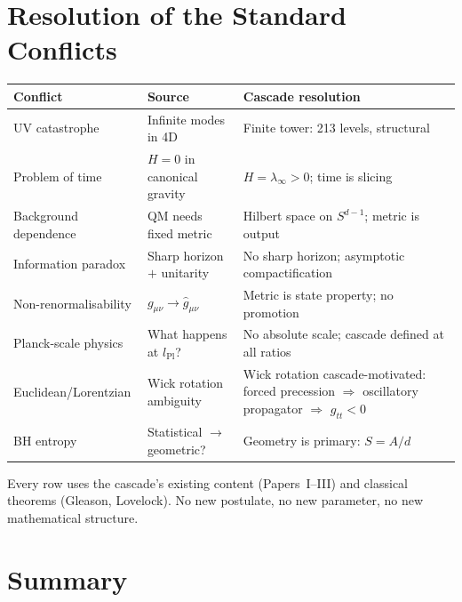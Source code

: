 \documentclass[12pt,a4paper]{article}
\begin{document}
\section{Resolution of the Standard Conflicts}\label{sec:resolution-of-the-standard-conflicts}

\begin{center}
\small
\begin{tabular}{p{3.5cm}p{3.8cm}p{4.5cm}}
\hline
Conflict & Source & Cascade resolution \\
\hline
UV catastrophe & Infinite modes in 4D & Finite tower: 213 levels, structural \\
Problem of time & $H = 0$ in canonical gravity & $H = \lambda_\infty > 0$; time is
slicing \\
Background dependence & QM needs fixed metric & Hilbert space on $S^{d-1}$; metric
is output \\
Information paradox & Sharp horizon $+$ unitarity & No sharp horizon; asymptotic
compactification \\
Non-renormalisability & $g_{\mu\nu} \to \hat{g}_{\mu\nu}$ & Metric is state property;
no promotion \\
Planck-scale physics & What happens at $l_{\mathrm{Pl}}$? & No absolute scale; cascade
defined at all ratios \\
Euclidean/\allowbreak Lorentzian & Wick rotation ambiguity & Wick rotation cascade-motivated:
forced precession $\Rightarrow$ oscillatory propagator $\Rightarrow$ $g_{tt} < 0$ \\
BH entropy & Statistical $\to$ geometric? & Geometry is primary: $S = A/d$ \\
\hline
\end{tabular}
\end{center}

Every row uses the cascade's existing content (Papers~I--III) and classical
theorems (Gleason, Lovelock). No new postulate, no new parameter, no new
mathematical structure.

\section{Summary}\label{sec:summary}
\end{document}

